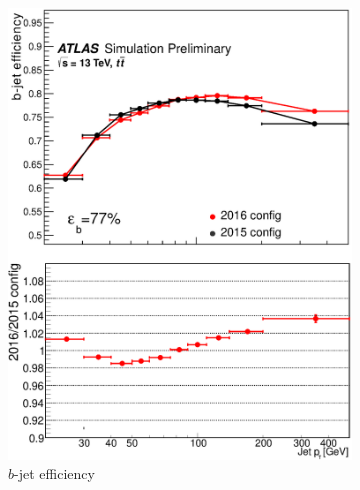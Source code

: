 \begin{figure}[!h]
\begin{subfigure}{0.5\textwidth}
   \includegraphics[width=\textwidth]{figures/efficiencyA_PREbis.eps}
	\caption{$b$-jet efficiency}
	\label{fig:effMV2}
\end{subfigure} %
\begin{subfigure}{0.5\textwidth}

\end{subfigure}
\end{figure}
